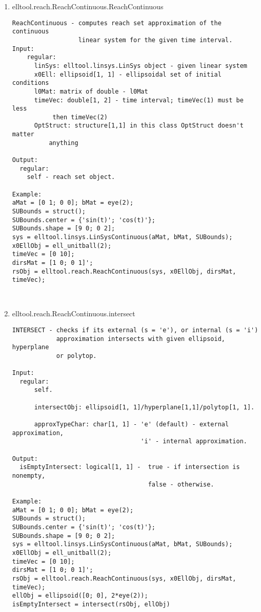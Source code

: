 \begin{enumerate}
\begin{lstlisting}
\end{lstlisting}
\fontfamily{\familydefault}
\selectfont
\item {elltool.reach.ReachContinuous.ReachContinuous}
\selectfont
\begin{lstlisting}
ReachContinuous - computes reach set approximation of the continuous
                  linear system for the given time interval.
Input:
    regular:
      linSys: elltool.linsys.LinSys object - given linear system
      x0Ell: ellipsoid[1, 1] - ellipsoidal set of initial conditions
      l0Mat: matrix of double - l0Mat
      timeVec: double[1, 2] - time interval; timeVec(1) must be less
           then timeVec(2)
      OptStruct: structure[1,1] in this class OptStruct doesn't matter
          anything

Output:
  regular:
    self - reach set object.

Example:
aMat = [0 1; 0 0]; bMat = eye(2);
SUBounds = struct();
SUBounds.center = {'sin(t)'; 'cos(t)'};
SUBounds.shape = [9 0; 0 2];
sys = elltool.linsys.LinSysContinuous(aMat, bMat, SUBounds);
x0EllObj = ell_unitball(2);
timeVec = [0 10];
dirsMat = [1 0; 0 1]';
rsObj = elltool.reach.ReachContinuous(sys, x0EllObj, dirsMat, timeVec);



\end{lstlisting}
\fontfamily{\familydefault}
\selectfont
\item {elltool.reach.ReachContinuous.intersect}
\selectfont
\begin{lstlisting}
INTERSECT - checks if its external (s = 'e'), or internal (s = 'i')
            approximation intersects with given ellipsoid, hyperplane
            or polytop.

Input:
  regular:
      self.

      intersectObj: ellipsoid[1, 1]/hyperplane[1,1]/polytop[1, 1].

      approxTypeChar: char[1, 1] - 'e' (default) - external approximation,
                                   'i' - internal approximation.

Output:
  isEmptyIntersect: logical[1, 1] -  true - if intersection is nonempty,
                                     false - otherwise.

Example:
aMat = [0 1; 0 0]; bMat = eye(2);
SUBounds = struct();
SUBounds.center = {'sin(t)'; 'cos(t)'};
SUBounds.shape = [9 0; 0 2];
sys = elltool.linsys.LinSysContinuous(aMat, bMat, SUBounds);
x0EllObj = ell_unitball(2);
timeVec = [0 10];
dirsMat = [1 0; 0 1]';
rsObj = elltool.reach.ReachContinuous(sys, x0EllObj, dirsMat, timeVec);
ellObj = ellipsoid([0; 0], 2*eye(2));
isEmptyIntersect = intersect(rsObj, ellObj)


\end{lstlisting}
\end{enumerate}
